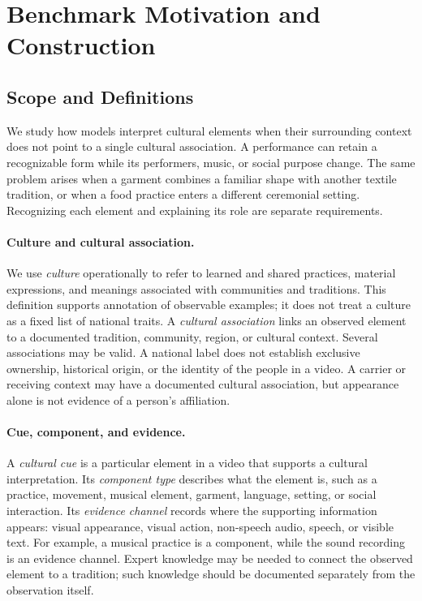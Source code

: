 \section{Benchmark Motivation and Construction}
\label{sec:benchmark}

\subsection{Scope and Definitions}
We study how models interpret cultural elements when their surrounding
context does not point to a single cultural association. A performance can
retain a recognizable form while its performers, music, or social purpose
change. The same problem arises when a garment combines a familiar shape
with another textile tradition, or when a food practice enters a different
ceremonial setting. Recognizing each element and explaining its role are
separate requirements.

\paragraph{Culture and cultural association.}
We use \emph{culture} operationally to refer to learned and shared practices,
material expressions, and meanings associated with communities and
traditions. This definition supports annotation of observable examples; it
does not treat a culture as a fixed list of national traits. A
\emph{cultural association} links an observed element to a documented
tradition, community, region, or cultural context. Several associations may
be valid. A national label does not establish exclusive ownership,
historical origin, or the identity of the people in a video.
A carrier or receiving context may have a documented cultural association,
but appearance alone is not evidence of a person's affiliation.

\paragraph{Cue, component, and evidence.}
A \emph{cultural cue} is a particular element in a video that supports a
cultural interpretation. Its \emph{component type} describes what the
element is, such as a practice, movement, musical element, garment,
language, setting, or social interaction. Its \emph{evidence channel}
records where the supporting information appears: visual appearance,
visual action, non-speech audio, speech, or visible text. For example, a
musical practice is a component, while the sound recording is an evidence
channel. Expert knowledge may be needed to connect the observed element
to a tradition; such knowledge should be documented separately from the
observation itself.

